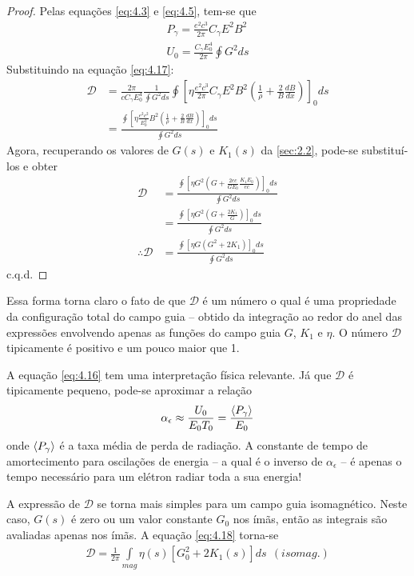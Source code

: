 \begin{proof}
	Pelas equações \eqref{eq:4.3} e \eqref{eq:4.5}, tem-se que
	\begin{align*}
		P_\gamma = \frac{e^2c^3}{2\pi}C_\gamma E^2B^2\\
		U_0 = \frac{C_\gamma E_0^4}{2\pi}\oint G^2 ds
	\end{align*}
	Substituindo na equação \eqref{eq:4.17}:
	\begin{align*}
		\mathscr{D} &= \frac{2\pi}{c C_\gamma E_0^4}\frac{1}{\oint G^2 ds}\oint \left[\eta \frac{e^2c^3}{2\pi}C_\gamma E^2B^2 \left(\frac{1}{\rho}+\frac{2}{B}\frac{dB}{dx}\right)\right]_0 ds\\
					&= \frac{\oint \left[\eta \frac{e^2c^2}{E_0^2} B^2 \left(\frac{1}{\rho}+\frac{2}{B}\frac{dB}{dx}\right)\right]_0 ds}{\oint G^2 ds}
	\end{align*}
	Agora, recuperando os valores de $G(s)$ e $K_1(s)$ da \autoref{sec:2.2}, pode-se substituí-los e obter
	\begin{align*}
		\mathscr{D} &= \frac{\oint \left[\eta G^2 \left(G +\frac{2ec}{G E_0}\frac{K_1 E_0}{ec}\right)\right]_0 ds}{\oint G^2 ds}\\
					&= \frac{\oint \left[\eta G^2 \left(G +\frac{2K_1}{G}\right)\right]_0 ds}{\oint G^2 ds}\\
		\therefore \mathscr{D} &= \frac{\oint \left[\eta G \left(G^2 +2K_1\right)\right]_0 ds}{\oint G^2 ds}
	\end{align*}
	c.q.d.
\end{proof}

Essa forma torna claro o fato de que $\mathscr{D}$ é um número o qual é uma propriedade da configuração total do campo guia -- obtido da integração ao redor do anel das expressões envolvendo apenas as funções do campo guia $G$, $K_1$ e $\eta$. O número $\mathscr{D}$ tipicamente é positivo e um pouco maior que 1.

A equação \eqref{eq:4.16} tem uma interpretação física relevante. Já que $\mathscr{D}$ é tipicamente pequeno, pode-se aproximar a relação
\begin{align}
	\alpha_\epsilon \approx \frac{U_0}{E_0T_0} = \frac{\left< P_\gamma \right>}{E_0}\label{eq:4.20}
\end{align}
onde $\left< P_\gamma \right>$ é a taxa média de perda de radiação. A constante de tempo de amortecimento para oscilações de energia -- a qual é o inverso de $\alpha_\epsilon$ -- é apenas o tempo necessário para um elétron radiar toda a sua energia!

A expressão de $\mathscr{D}$ se torna mais simples para um campo guia isomagnético. Neste caso, $G(s)$ é zero ou um valor constante $G_0$ nos ímãs, então as integrais são avaliadas apenas nos ímãs. A equação \eqref{eq:4.18} torna-se
\begin{align}
	\mathscr{D} = \frac{1}{2\pi} \int\limits_{mag}^{}\eta(s)\left[G_0^2 + 2K_1(s)\right]ds\ \ (isomag.)
\end{align}

